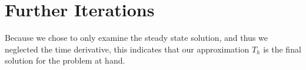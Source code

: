 \documentclass[../fem.tex]{subfiles}
\begin{document}
\section{Further Iterations}%
\label{sec:further_iterations}

Because we chose to only examine the steady state solution, and thus we
neglected the time derivative, this indicates that our approximation $T_h$ is
the final solution for the problem at hand.
\end{document}
